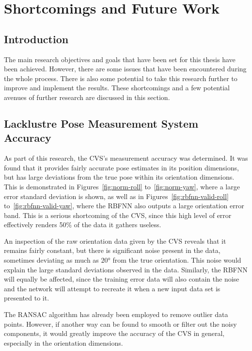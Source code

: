 \section{Shortcomings and Future Work}

\subsection{Introduction}

The main research objectives and goals that have been set for this thesis have been achieved. However, there are some issues that have been encountered during the whole process. There is also some potential to take this research further to improve and implement the results. These shortcomings and a few potential avenues of further research are discussed in this section. 

\subsection{Lacklustre Pose Measurement System Accuracy}

As part of this research, the CVS's measurement accuracy was determined. It was found that it provides fairly accurate pose estimates in its position dimensions, but has large deviations from the true pose within its orientation dimensions. This is demonstrated in Figures~\ref{fig:norm-roll} to~\ref{fig:norm-yaw}, where a large error standard deviation is shown, as well as in Figures~\ref{fig:rbfnn-valid-roll} to~\ref{fig:rbfnn-valid-yaw}, where the RBFNN also outputs a large orientation error band. This is a serious shortcoming of the CVS, since this high level of error effectively renders 50\% of the data it gathers useless. 

An inspection of the raw orientation data given by the CVS reveals that it remains fairly constant, but there is significant noise present in the data, sometimes deviating as much as $\ang{20}$ from the true orientation. This noise would explain the large standard deviations observed in the data. Similarly, the RBFNN will equally be affected, since the training error data will also contain the noise and the network will attempt to recreate it when a new input data set is presented to it. 

The RANSAC algorithm has already been employed to remove outlier data points. However, if another way can be found to smooth or filter out the noisy components, it would greatly improve the accuracy of the CVS in general, especially in the orientation dimensions. 

